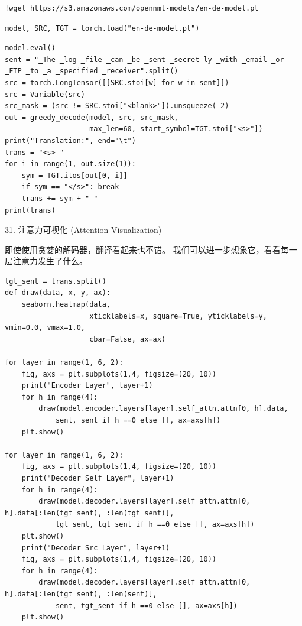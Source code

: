 \begin{Verbatim}
!wget https://s3.amazonaws.com/opennmt-models/en-de-model.pt
\end{Verbatim}

\begin{Verbatim}
model, SRC, TGT = torch.load("en-de-model.pt")
\end{Verbatim}

\begin{Verbatim}
model.eval()
sent = "▁The ▁log ▁file ▁can ▁be ▁sent ▁secret ly ▁with ▁email ▁or ▁FTP ▁to ▁a ▁specified ▁receiver".split()
src = torch.LongTensor([[SRC.stoi[w] for w in sent]])
src = Variable(src)
src_mask = (src != SRC.stoi["<blank>"]).unsqueeze(-2)
out = greedy_decode(model, src, src_mask, 
                    max_len=60, start_symbol=TGT.stoi["<s>"])
print("Translation:", end="\t")
trans = "<s> "
for i in range(1, out.size(1)):
    sym = TGT.itos[out[0, i]]
    if sym == "</s>": break
    trans += sym + " "
print(trans)
\end{Verbatim}

31. 注意力可视化 (Attention Visualization)

即使使用贪婪的解码器，翻译看起来也不错。 我们可以进一步想象它，看看每一层注意力发生了什么。

\begin{Verbatim}
tgt_sent = trans.split()
def draw(data, x, y, ax):
    seaborn.heatmap(data, 
                    xticklabels=x, square=True, yticklabels=y, vmin=0.0, vmax=1.0, 
                    cbar=False, ax=ax)
    
for layer in range(1, 6, 2):
    fig, axs = plt.subplots(1,4, figsize=(20, 10))
    print("Encoder Layer", layer+1)
    for h in range(4):
        draw(model.encoder.layers[layer].self_attn.attn[0, h].data, 
            sent, sent if h ==0 else [], ax=axs[h])
    plt.show()
    
for layer in range(1, 6, 2):
    fig, axs = plt.subplots(1,4, figsize=(20, 10))
    print("Decoder Self Layer", layer+1)
    for h in range(4):
        draw(model.decoder.layers[layer].self_attn.attn[0, h].data[:len(tgt_sent), :len(tgt_sent)], 
            tgt_sent, tgt_sent if h ==0 else [], ax=axs[h])
    plt.show()
    print("Decoder Src Layer", layer+1)
    fig, axs = plt.subplots(1,4, figsize=(20, 10))
    for h in range(4):
        draw(model.decoder.layers[layer].self_attn.attn[0, h].data[:len(tgt_sent), :len(sent)], 
            sent, tgt_sent if h ==0 else [], ax=axs[h])
    plt.show()
\end{Verbatim}

